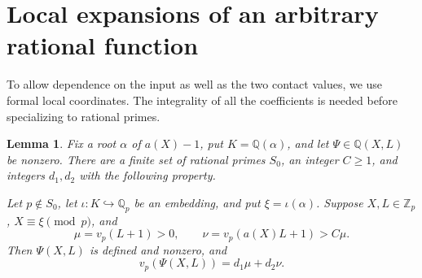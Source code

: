 \documentclass[11pt,a4paper]{article}
\newtheorem{lemma}[theorem]{Lemma}
\theoremstyle{remark}\newtheorem{remark}[theorem]{Remark}
\newcommand{\Q}{\mathbb Q}\newcommand{\Z}{\mathbb Z}
\begin{document}
\section{Local expansions of an arbitrary rational function}

To allow dependence on the input as well as the two contact
values, we use formal local coordinates. The integrality of
all the coefficients is needed before specializing to rational
primes.

\begin{lemma}\label{lem:formal}
Fix a root \(\alpha\) of \(a(X)-1\), put \(K=\Q(\alpha)\), and
let \(\Psi\in\Q(X,L)\) be nonzero. There are a finite set of
rational primes \(S_0\), an integer \(C\ge1\), and integers
\(d_1,d_2\) with the following property.

Let \(p\notin S_0\), let \(\iota:K\hookrightarrow\Q_p\) be an
embedding, and put \(\xi=\iota(\alpha)\). Suppose
\(X,L\in\Z_p\), \(X\equiv\xi\pmod p\), and
\[
     \mu=v_p(L+1)>0,\qquad
     \nu=v_p(a(X)L+1)>C\mu .
\]
Then \(\Psi(X,L)\) is defined and nonzero, and
\begin{equation}\label{eq:formalvaluation}
                         v_p(\Psi(X,L))=d_1\mu+d_2\nu .
\end{equation}
\end{lemma}
\end{document}
